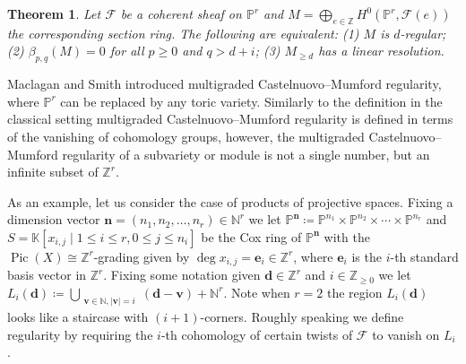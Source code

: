 \documentclass[11pt,reqno]{amsart}
\newtheorem{theorem}[lemma]{Theorem}
\newtheorem{defn}[lemma]{Definition}
\theoremstyle{remark}
\newcommand{\reg}{\operatorname{reg}}
\newcommand{\Pic}{\operatorname{Pic}}
\newcommand{\dd}{\mathbf d}
\newcommand{\ee}{\mathbf e}
\newcommand{\vv}{\mathbf v}
\newcommand{\nn}{\mathbf n}
\newcommand{\cF}{\mathcal{F}}
\newcommand{\C}{\mathbb{C}}
\newcommand{\K}{\mathbb{K}}
\newcommand{\N}{\mathbb{N}}
\renewcommand{\P}{\mathbb{P}}
\newcommand{\Z}{\mathbb{Z}}
\begin{document}

%


\begin{theorem}\cite{eisenbudGoto84}\label{thm:eisenbud-goto}
Let $\cF$ be a coherent sheaf on $\P^{r}$ and $M=\bigoplus_{e\in\Z} H^0(\P^{r},\cF(e))$ the corresponding section ring. The following are equivalent: (1) $M$ is $d$-regular; (2) $\beta_{p,q}(M)=0$ for all $p\geq0$ and $q>d+i$; (3) $M_{\geq d}$ has a linear resolution. 
\end{theorem}

Maclagan and Smith introduced multigraded Castelnuovo--Mumford regularity, where $\P^{r}$ can be replaced by any toric variety. Similarly to the definition in the classical setting multigraded Castelnuovo--Mumford regularity is defined in terms of the vanishing of cohomology groups, however, the multigraded Castelnuovo--Mumford regularity of a subvariety or module is not a single number, but an infinite subset of $\Z^{r}$. 

As an example, let us consider the case of products of projective spaces. Fixing a dimension vector $\nn=(n_1,n_2,\ldots,n_{r})\in \N^{r}$ we let $\P^{\nn}\coloneqq \P^{n_1}\times \P^{n_2}\times \cdots \times \P^{n_r}$ and $S=\K[x_{i,j} \; |\; 1\leq i \leq r, 0\leq j \leq n_{i}]$ be the Cox ring of $\P^{\nn}$ with the $\Pic(X)\cong \Z^{r}$-grading given by $\deg x_{i,j} = \ee_{i} \in \Z^{r}$, where $\ee_{i}$ is the $i$-th standard basis vector in $\Z^{r}$. Fixing some notation given $\dd\in \Z^{r}$ and $i\in \Z_{\geq0}$ we let $L_{i}(\dd)\coloneqq \bigcup_{\substack{\vv \in \N, |\vv| = i}} (\dd-\vv)+\N^{r}$. Note when $r=2$ the region $L_{i}(\dd)$ looks like a staircase with $(i+1)$-corners. Roughly speaking we define regularity by requiring the $i$-th cohomology of certain twists of $\cF$ to vanish on $L_{i}$. 
\end{document}

